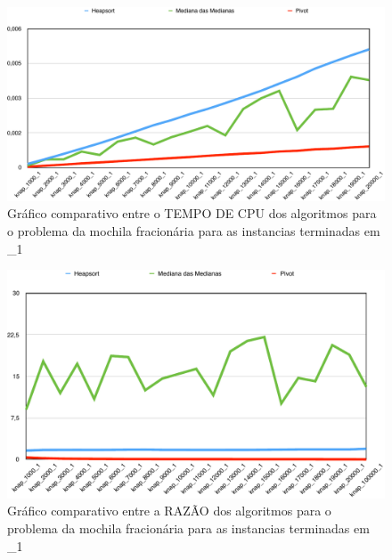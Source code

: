 \documentclass[
	12pt,				%
	oneside,			%
	a4paper,			%
	english,			%
	french,				%
	spanish,			%
	brazil,				%
	]{abntex2}
\begin{document}
\begin{figure}[H]
 \centering
 \includegraphics[width=6.4in]{charts/knap_time_1.pdf}
 \caption{Gráfico comparativo entre o TEMPO DE CPU dos algoritmos para o problema da mochila fracionária para as instancias terminadas em \_1}
 \label{fig:AlutGraphTimeAll}
\end{figure}

\begin{figure}[H]
 \centering
 \includegraphics[width=6.4in]{charts/knap_raz_1.pdf}
 \caption{Gráfico comparativo entre a RAZÃO dos algoritmos para o problema da mochila fracionária para as instancias terminadas em \_1}
 \label{fig:AlutGraphTimeAll}
\end{figure}
\end{document}
